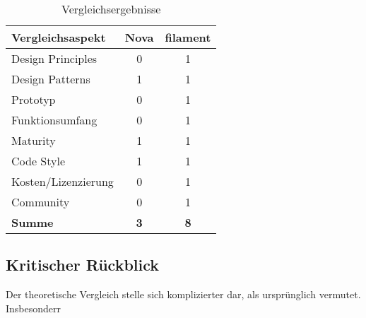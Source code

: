 \begin{table}[h!]
    \centering
    \caption{Vergleichsergebnisse}
    \label{tab:vergleichsergebnisse}
    \begin{tabular}{|l|c|c|}
        \hline
        \textbf{Vergleichsaspekt} & \textbf{Nova} & \textbf{filament} \\ \hline
        Design Principles         & 0             & 1                 \\ \hline
        Design Patterns           & 1             & 1                 \\ \hline
        Prototyp                  & 0             & 1                 \\ \hline
        Funktionsumfang           & 0             & 1                 \\ \hline
        Maturity                  & 1             & 1                 \\ \hline
        Code Style                & 1             & 1                 \\ \hline
        Kosten/Lizenzierung       & 0             & 1                 \\ \hline
        Community                 & 0             & 1                 \\ \hline
        \textbf{Summe}            & \textbf{3}    & \textbf{8}        \\ \hline
    \end{tabular}
\end{table}

\subsection{Kritischer Rückblick}
Der theoretische Vergleich stelle sich komplizierter dar, als ursprünglich vermutet.
Insbesonderr
